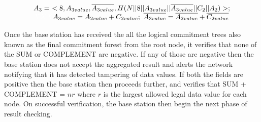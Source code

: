 		\begin{equation*}
			\begin{array}{l}
				A_{3} =\ <8, A_{3value}, \overline{A_{3value}}, H(N || 8 || A_{3value} || \overline{A_{3value}} || C_{2} ||A_{2}) >;\\
				\textcolor{white}{XXX} A_{3value} = A_{2value} + C_{2value};\ \overline{A_{3value}} = \overline{A_{2value}} + \overline{C_{2value}}
			\end{array}
		\end{equation*}
		
		Once the base station has received the all the logical commitment trees also known as the final commitment forest from the root node, it verifies that none of the SUM or COMPLEMENT are negative. 
		If any of those are negative then the base station does not accept the aggregated result and alerts the network notifying that it has detected tampering of data values. 
		If both the fields are positive then the base station then proceeds further, and verifies that SUM + COMPLEMENT = $nr$ where $r$ is the largest allowed legal data value for each node.
		On successful verification, the base station then begin the next phase of result checking.

